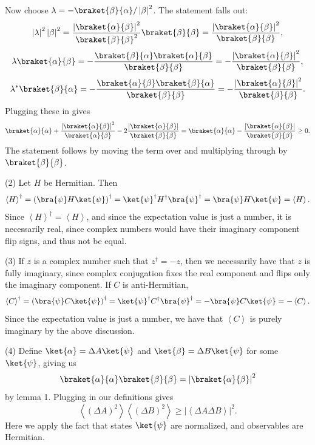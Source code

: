 \documentclass[11pt, letterpaper]{article}
\begin{document}
Now choose $\lambda =-\braket{\beta }{\alpha } / \left| \beta  \right| ^2$. The statement falls out:
\[
	\left| \lambda  \right| ^2\left| \beta  \right| ^2=\frac{\left| \braket{\alpha }{\beta } \right| ^2}{\braket{\beta }{\beta }^2} \braket{\beta }{\beta }=\frac{\left| \braket{\alpha }{\beta } \right| ^2}{\braket{\beta }{\beta }} 
,\]
\[
	\lambda \braket{\alpha }{\beta }=-\frac{\braket{\beta }{\alpha }\braket{\alpha }{\beta }}{\braket{\beta }{\beta }} =-\frac{\left| \braket{\alpha }{\beta } \right| ^2}{\braket{\beta }{\beta }} ,
\]
\[
	\lambda ^*\braket{\beta }{\alpha }=-\frac{\braket{\alpha }{\beta }\braket{\beta }{\alpha }}{\braket{\beta }{\beta }} =-\frac{\left| \braket{\alpha }{\beta } \right| ^2}{\braket{\beta }{\beta }} 
.\]
Plugging these in gives
\[
	\braket{\alpha }{\alpha }+\frac{\left| \braket{\alpha }{\beta } \right| ^2}{\braket{\alpha }{\beta }} -2\frac{\left| \braket{\alpha }{\beta } \right| }{\braket{\beta }{\beta }}=\braket{\alpha }{\alpha }-\frac{\left| \braket{\alpha }{\beta } \right| }{\braket{\beta }{\beta }} \geq 0
.\]
The statement follows by moving the term over and multiplying through by $\braket{\beta }{\beta }$.


(2) Let $H$ be Hermitian. Then
\[
	\left\langle H \right\rangle^\dagger =\left(\bra{\psi }H\ket{\psi }\right)^\dagger=\ket{\psi }^\dagger H^\dagger\bra{\psi }^\dagger=\bra{\psi }H\ket{\psi }=\left\langle H \right\rangle 
.\]
Since $\left\langle H \right\rangle ^\dagger=\left\langle H \right\rangle $, and since the expectation value is just a number, it is necessarily real, since complex numbers would have their imaginary component flip signs, and thus not be equal.

(3) If $z$ is a complex number such that $z^\dagger =-z$, then we necessarily have that $z$ is fully imaginary, since complex conjugation fixes the real component and flips only the imaginary component. If $C$ is anti-Hermitian,
\[
	\left\langle C \right\rangle ^\dagger =\left( \bra{\psi }C\ket{\psi } \right) ^\dagger=\ket{\psi }^\dagger C^\dagger\bra{\psi }^\dagger=-\bra{\psi }C\ket{\psi }=-\left\langle C \right\rangle 
.\]
Since the expectation value is just a number, we have that $\left\langle C \right\rangle $ is purely imaginary by the above discussion.

(4) Define $\ket{\alpha }=\Delta A\ket{\psi }$ and $\ket{\beta }=\Delta B\ket{\psi }$ for some $\ket{\psi }$, giving us
\[
	\braket{\alpha }{\alpha }\braket{\beta }{\beta }=\left| \braket{\alpha }{\beta } \right| ^2
\]
by lemma 1. Plugging in our definitions gives
\[
	\left\langle (\Delta A)^2 \right\rangle \left\langle (\Delta B)^2 \right\rangle \geq \left| \left\langle \Delta A\Delta B \right\rangle  \right| ^2
.\]
Here we apply the fact that states $\ket{\psi }$ are normalized, and observables are Hermitian.
\end{document}
